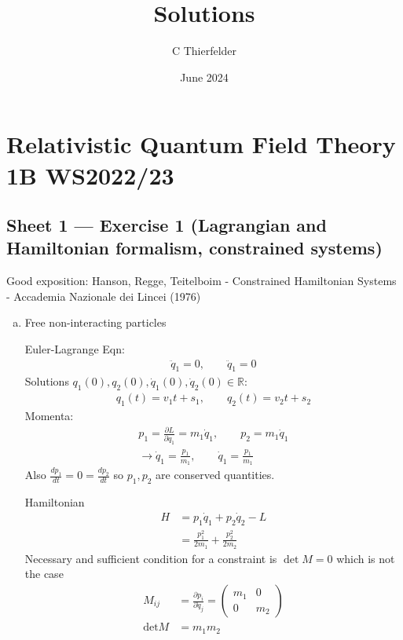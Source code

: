 \documentclass[10pt,a4paper]{report}
\title{Solutions}
\author{C Thierfelder}
\date{June 2024}
\theoremstyle{definition}
\begin{document}
\maketitle

\chapter{Relativistic Quantum Field Theory 1B WS2022/23}
\section{Sheet 1 — Exercise 1 (Lagrangian and Hamiltonian formalism, constrained systems)}
Good exposition: {\sc Hanson, Regge, Teitelboim} - Constrained Hamiltonian Systems - Accademia Nazionale dei Lincei (1976)
\begin{enumerate}[a)]
\item Free non-interacting particles

Euler-Lagrange Eqn:
\begin{align}
\ddot{q}_1=0,\qquad \ddot{q}_1=0
\end{align}
Solutions $q_1(0),q_2(0),\dot{q}_1(0),\dot{q}_2(0)\in\mathbb{R}$:
\begin{align}
q_1(t)=v_1t+s_1,\qquad q_2(t)=v_2t+s_2
\end{align}
Momenta:
\begin{align}
p_1=\frac{\partial L}{\partial q_1}=m_1\dot{q}_1,\qquad p_2=m_1\dot{q}_1\\
\rightarrow \dot{q}_1=\frac{p_1}{m_1},\qquad \dot{q}_1=\frac{p_1}{m_1}
\end{align}
Also $\frac{dp_1}{dt}=0=\frac{dp_2}{dt}$ so $p_1, p_2$ are conserved quantities.

Hamiltonian
\begin{align}
H&=p_1\dot{q}_1+p_2\dot{q}_2-L\\
&=\frac{p_1^2}{2m_1}+\frac{p_2^2}{2m_2}
\end{align}
Necessary and sufficient condition for a constraint is $\det M = 0$ which is not the case
\begin{align}
M_{ij}&=\frac{\partial p_i}{\partial \dot{q}_j}=\left(\begin{array}{cc}
m_1 & 0\\
0 & m_2
\end{array}\right)\\
\text{det}M&=m_1m_2
\end{align}


\end{enumerate}
\end{document}
